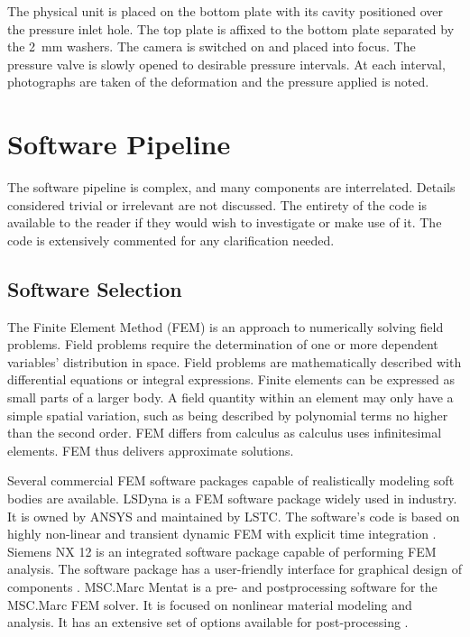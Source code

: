 The physical unit is placed on the bottom plate with its cavity positioned over the pressure inlet hole. The top plate is affixed to the bottom plate separated by the \SI{2}{mm} washers. The camera is switched on and placed into focus. The pressure valve is slowly opened to desirable pressure intervals. At each interval, photographs are taken of the deformation and the pressure applied is noted.

\section{Software Pipeline}
\label{sec:SW}

The software pipeline is complex, and many components are interrelated. Details considered trivial or irrelevant are not discussed. The entirety of the code is available to the reader if they would wish to investigate or make use of it. The code is extensively commented for any clarification needed.

\subsection{Software Selection}

The Finite Element Method (FEM) is an approach to numerically solving field problems. Field problems require the determination of one or more dependent variables' distribution in space. Field problems are mathematically described with differential equations or integral expressions. Finite elements can be expressed as small parts of a larger body. A field quantity within an element may only have a simple spatial variation, such as being described by polynomial terms no higher than the second order. FEM differs from calculus as calculus uses infinitesimal elements. FEM thus delivers approximate solutions. \citep{Cook2002}

Several commercial FEM software packages capable of realistically modeling soft bodies are available. LSDyna is a FEM software package widely used in industry. It is owned by ANSYS and maintained by LSTC. The software's code is based on highly non-linear and transient dynamic FEM with explicit time integration \citep{LSDyna}. Siemens NX 12 is an integrated software package capable of performing FEM analysis. The software package has a user-friendly interface for graphical design of components \citep{NX12}. MSC.Marc Mentat is a pre- and postprocessing software for the MSC.Marc FEM solver. It is focused on nonlinear material modeling and analysis. It has an extensive set of options available for post-processing \citep{MSC}.

